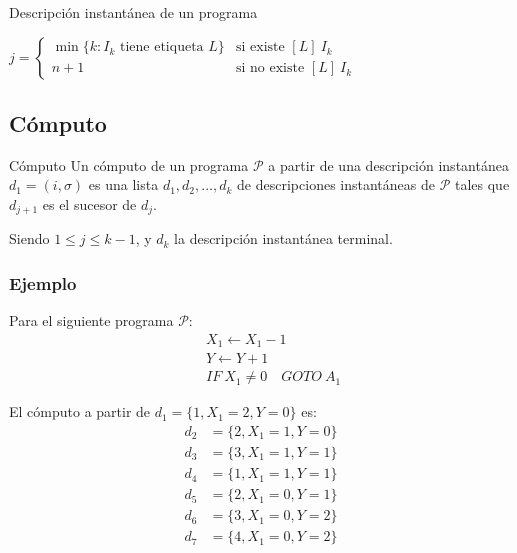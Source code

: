 \begin{definicion}{Descripción instantánea de un programa}{}
\begin{itemize}
\begin{enumerate}
\begin{itemize}
                        $j = \begin{cases} 
                    \min{\{ k: I_k \text{ tiene etiqueta } L \}} & \text{si 
                    existe } [L] ~ I_k \\
                    n+1 & \text{si no existe } [L] ~ I_k
                \end{cases}$
                \end{itemize}
        \end{enumerate}
    \end{itemize}
\end{definicion}

\subsection{Cómputo}
\begin{definicion}{Cómputo}{}
    Un cómputo de un programa $\mathcal{P}$ a partir de una descripción 
    instantánea $d_1 = (i, \sigma)$ es una lista 
    $d_1, d_2, \dotsc, d_k$ de descripciones
    instantáneas de $\mathcal{P}$ tales que $d_{j+1}$ es el sucesor de $d_j$.

    Siendo $ 1 \leq j \leq k-1$, y $d_k$ la descripción 
    instantánea terminal.
\end{definicion}

\subsubsection{Ejemplo}

Para el siguiente programa $\mathcal{P}$:
\begin{align*}
    [A_1] \quad &X_1 \gets X_1 - 1 \\
                &Y \gets Y + 1 \\
                &IF ~ X_1 \neq 0 \quad GOTO ~ A_1
\end{align*}

El cómputo a partir de $d_1 = \{ 1, X_1 = 2, Y = 0 \}$ es:
\begin{align*}
    d_2 &= \{ 2, X_1 = 1, Y = 0 \} \\
    d_3 &= \{ 3, X_1 = 1, Y = 1 \} \\
    d_4 &= \{ 1, X_1 = 1, Y = 1 \} \\
    d_5 &= \{ 2, X_1 = 0, Y = 1 \} \\
    d_6 &= \{ 3, X_1 = 0, Y = 2 \} \\
    d_7 &= \{ 4, X_1 = 0, Y = 2 \}
\end{align*}

